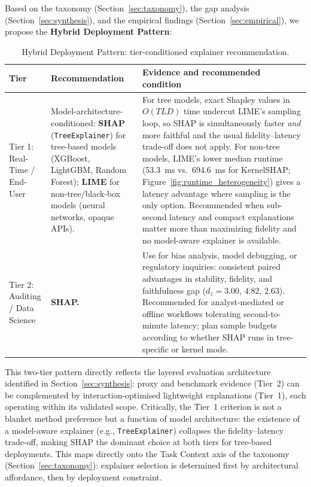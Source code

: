 \documentclass[twoside,11pt]{article}
\begin{document}
Based on the taxonomy (Section~\ref{sec:taxonomy}), the gap analysis
(Section~\ref{sec:synthesis}), and the empirical findings
(Section~\ref{sec:empirical}), we propose the \textbf{Hybrid Deployment
Pattern}:

\begin{table}[h]
\centering
\caption{Hybrid Deployment Pattern: tier-conditioned explainer recommendation.}
\label{tab:hybrid_deployment}
\begin{tabularx}{\linewidth}{p{2.0cm} p{3.0cm} X}
\toprule
\textbf{Tier} & \textbf{Recommendation} & \textbf{Evidence and recommended condition} \\
\midrule
Tier 1: Real-Time / End-User &
Model-architecture-conditioned: \textbf{SHAP} (\texttt{TreeExplainer}) for
tree-based models (XGBoost, LightGBM, Random Forest); \textbf{LIME} for
non-tree/black-box models (neural networks, opaque APIs). &
For tree models, exact Shapley values in $O(TLD)$ time undercut LIME's
sampling loop, so SHAP is simultaneously faster \emph{and} more faithful
and the usual fidelity--latency trade-off does not apply. For non-tree
models, LIME's lower median runtime (53.3~ms vs.\ 694.6~ms for
KernelSHAP; Figure~\ref{fig:runtime_heterogeneity}) gives a latency
advantage where sampling is the only option. Recommended when sub-second
latency and compact explanations matter more than maximizing fidelity
and no model-aware explainer is available. \\[6pt]
Tier 2: Auditing / Data Science &
\textbf{SHAP.} &
Use for bias analysis, model debugging, or regulatory inquiries: consistent
paired advantages in stability, fidelity, and faithfulness gap ($d_z =
3.00$, $4.82$, $2.63$). Recommended for analyst-mediated or offline
workflows tolerating second-to-minute latency; plan sample budgets
according to whether SHAP runs in tree-specific or kernel mode. \\
\bottomrule
\end{tabularx}
\end{table}

This two-tier pattern directly reflects the layered evaluation
architecture identified in Section~\ref{sec:synthesis}: proxy and
benchmark evidence (Tier~2) can be complemented by interaction-optimised
lightweight explanations (Tier~1), each operating within its validated
scope.  Critically, the Tier~1 criterion is not a blanket method preference
but a function of model architecture: the existence of a model-aware
explainer (e.g., \texttt{TreeExplainer}) collapses the fidelity--latency
trade-off, making SHAP the dominant choice at both tiers for tree-based
deployments.  This maps directly onto the Task Context axis of the taxonomy
(Section~\ref{sec:taxonomy}): explainer selection is determined first by
architectural affordance, then by deployment constraint.
\end{document}

